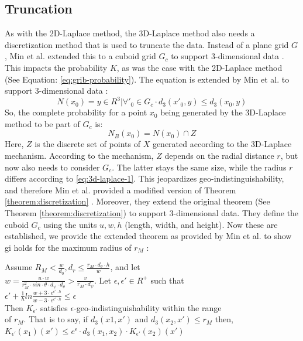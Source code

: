 \newpage
\subsection{Truncation}
As with the 2D-Laplace method, the 3D-Laplace method also needs a discretization method that is used to truncate the data.
Instead of a plane grid $G$, Min et al. extended this to a cuboid grid $G_c$ to support 3-dimensional data \citep{9646489}.
This impacts the probability $K$, as was the case with the 2D-Laplace method (See Equation: \ref{eq:grib-probability}).
The equation is extended by Min et al. to support 3-dimensional data \citep{9646489}:
\begin{equation}
  N(x_0) = { y \in R^3 | \forall'_{0} \in G_c \cdot d_3(x'_{0}, y) \leq d_3(x_0, y)}
  \label{eq:3d-grid-probability}
\end{equation}
So, the complete probability for a point $x_0$ being generated by the 3D-Laplace method to be part of $G_c$ is:
\begin{equation}
  N_B(x_0) = N(x_0) \cap Z
  \label{eq:3d-grid-probability-2}
\end{equation}
Here, $Z$ is the discrete set of points of $X$ generated according to the 3D-Laplace mechanism.
According to the mechanism, $Z$ depends on the radial distance $r$, but now also needs to consider $G_c$.
The latter stays the same size, while the radius $r$ differs according to \ref{eq:3d-laplace-1}.
This jeopardizes geo-indistinguishability, and therefore Min et al. provided a modified version of Theorem \ref{theorem:discretization} \citep{9646489}.
Moreover, they extend the original theorem (See Theorem \ref{theorem:discretization}) to support 3-dimensional data.
They define the cuboid $G_c$ using the units $u, w, h$ (length, width, and height).
Now these are established, we provide the extended theorem as provided by Min et al. to show \gls{gi} holds for the maximum radius of $r_M$ \citep{9646489}:
\begin{theorem}
  Assume $R_M < \frac{w}{d_0}, d_r \leq \frac{r_M \cdot d_\theta \cdot h}{w}$, and let \\
  $w = \frac{u \cdot w}{r^2_M \cdot sin \cdot \theta \cdot d_\psi \cdot d_\theta} > \frac{v}{r_M \cdot d_\psi}$. Let $\epsilon, \epsilon' \in R^+$ such that \\
  $\epsilon' + \frac{1}{h} ln \frac{w + 3 \cdot e^{\epsilon' \cdot h}}{w - 3 \cdot e^{\epsilon' \cdot h}} \leq \epsilon$ \\
  Then $K_{\epsilon'}$ satisfies $\epsilon$-geo-indistinguishability within the range \\
  of $r_M$. That is to say, if $d_3(x1, x')$ and $d_3(x_2, x') \leq r_M$ then, \\
  $K_{\epsilon'}(x_1)(x') \leq e^\epsilon \cdot d_3(x_1, x_2) \cdot K_{\epsilon'}(x_2)(x')$
\end{theorem}

